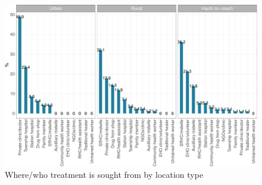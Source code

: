 \documentclass[12pt,a4paper]{article}
\begin{document}
\begin{figure}[H]

{\centering \includegraphics{kayahReport_files/figure-latex/ari6plot-1} 

}

\caption{Where/who treatment is sought from by location type}\label{fig:ari6plot}
\end{figure}
\end{document}
